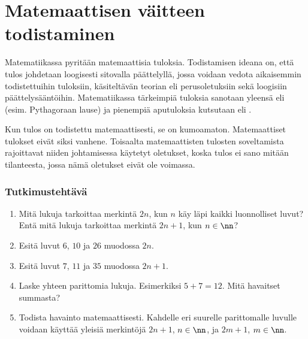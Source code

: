 \chapter{Matemaattisen väitteen todistaminen}

Matematiikassa pyritään  matemaattisia tuloksia.
Todistamisen ideana on, että tulos johdetaan loogisesti sitovalla päättelyllä,
jossa voidaan vedota aikaisemmin todistettuihin tuloksiin,
käsiteltävän teorian  eli perusoletuksiin sekä loogisiin päättelysääntöihin.
Matematiikassa tärkeimpiä tuloksia sanotaan yleensä  eli
 (esim. Pythagoraan lause) ja pienempiä aputuloksia kutsutaan
 eli .

Kun tulos on todistettu matemaattisesti, se on kumoamaton. Matemaattiset tulokset eivät siksi vanhene.
Toisaalta matemaattisten tulosten soveltamista rajoittavat niiden johtamisessa käytetyt oletukset,
koska tulos ei sano mitään tilanteesta, jossa nämä oletukset eivät ole voimassa.

\subsection*{Tutkimustehtävä} %

\begin{enumerate}
	\item Mitä lukuja tarkoittaa merkintä $2n$, kun $n$ käy läpi kaikki luonnolliset luvut? Entä mitä lukuja 
		tarkoittaa merkintä $2n + 1$, kun $n\in \nn$?
	\item %
		Esitä luvut $6$, $10$ ja $26$ muodossa $2n$.
	\item %
		Esitä luvut $7$, $11$ ja $35$ muodossa $2n+1$.
	\item Laske yhteen parittomia lukuja. Esimerkiksi $5 + 7 = 12$. Mitä havaitset summasta?
	\item Todista havainto matemaattisesti. Kahdelle eri suurelle parittomalle luvulle voidaan käyttää yleisiä 
		merkintöjä $2n + 1$, $n \in\nn$, ja $2m + 1$, $m \in\nn$.
\end{enumerate}

